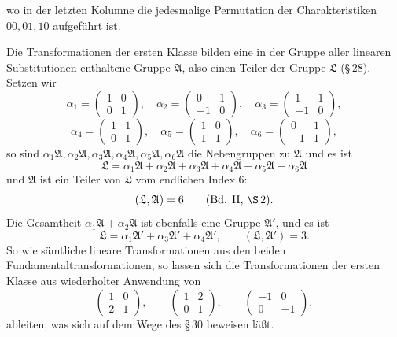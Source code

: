 \documentclass[11pt]{article}
\begin{document}
wo in der letzten Kolumne die jedesmalige Permutation der Charakteristiken $00,01,10$ aufgeführt ist.

Die Transformationen der ersten Klasse bilden eine in der Gruppe aller linearen Substitutionen enthaltene Gruppe $\mathfrak A$, also einen Teiler der Gruppe $\mathfrak L$ (\S\,28). Setzen wir
\[
\alpha_1=\begin{pmatrix}1&0\\0&1\end{pmatrix},\quad
\alpha_2=\begin{pmatrix}0&1\\-1&0\end{pmatrix},\quad
\alpha_3=\begin{pmatrix}1&1\\-1&0\end{pmatrix},
\]
\[
\alpha_4=\begin{pmatrix}1&1\\0&1\end{pmatrix},\quad
\alpha_5=\begin{pmatrix}1&0\\1&1\end{pmatrix},\quad
\alpha_6=\begin{pmatrix}0&1\\-1&1\end{pmatrix},
\]
so sind $\alpha_1\mathfrak A,\alpha_2\mathfrak A,\alpha_3\mathfrak A,\alpha_4\mathfrak A,\alpha_5\mathfrak A,\alpha_6\mathfrak A$ die Nebengruppen zu $\mathfrak A$ und es ist
\[
\mathfrak L=\alpha_1\mathfrak A+\alpha_2\mathfrak A+\alpha_3\mathfrak A+\alpha_4\mathfrak A+\alpha_5\mathfrak A+\alpha_6\mathfrak A
\]
und $\mathfrak A$ ist ein Teiler von $\mathfrak L$ vom endlichen Index $6$:
\[
(\mathfrak L,\mathfrak A)=6\qquad(\hbox{Bd. II, }\S\,2).
\]
Die Gesamtheit $\alpha_1\mathfrak A+\alpha_2\mathfrak A$ ist ebenfalls eine Gruppe $\mathfrak A'$, und es ist
\[
\mathfrak L=\alpha_1\mathfrak A'+\alpha_3\mathfrak A'+\alpha_4\mathfrak A',
\qquad (\mathfrak L,\mathfrak A')=3.
\]
So wie sämtliche lineare Transformationen aus den beiden Fundamentaltransformationen, so lassen sich die Transformationen der ersten Klasse aus wiederholter Anwendung von
\[
\begin{pmatrix}1&0\\2&1\end{pmatrix},
\qquad
\begin{pmatrix}1&2\\0&1\end{pmatrix},
\qquad
\begin{pmatrix}-1&0\\0&-1\end{pmatrix},
\]
ableiten, was sich auf dem Wege des \S\,30 beweisen läßt.
\end{document}

